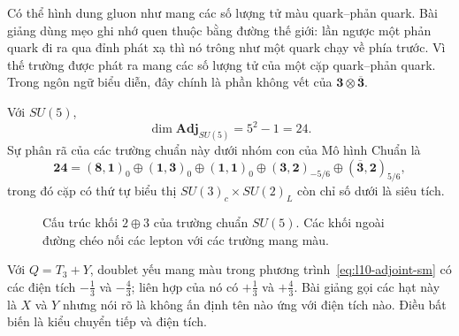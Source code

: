 Có thể hình dung gluon như mang các số lượng tử màu quark--phản quark. Bài giảng dùng mẹo ghi nhớ quen thuộc bằng đường thế giới: lần ngược một phản quark đi ra qua đỉnh phát xạ thì nó trông như một quark chạy về phía trước. Vì thế trường được phát ra mang các số lượng tử của một cặp quark--phản quark. Trong ngôn ngữ biểu diễn, đây chính là phần không vết của \(\mathbf3\otimes\overline{\mathbf3}\).

Với \(SU(5)\),
\begin{equation}
\dim\mathbf{Adj}_{SU(5)}=5^2-1=24.
\end{equation}
Sự phân rã của các trường chuẩn này dưới nhóm con của Mô hình Chuẩn là
\begin{equation}
\mathbf{24}
=
(\mathbf8,\mathbf1)_0
\oplus(\mathbf1,\mathbf3)_0
\oplus(\mathbf1,\mathbf1)_0
\oplus(\mathbf3,\mathbf2)_{-5/6}
\oplus(\overline{\mathbf3},\mathbf2)_{5/6},
\label{eq:l10-adjoint-sm}
\end{equation}
trong đó cặp có thứ tự biểu thị \(SU(3)_c\times SU(2)_L\) còn chỉ số dưới là siêu tích.


\begin{figure}[htbp]
\centering
{}
\caption{Cấu trúc khối \(2\oplus3\) của trường chuẩn \(SU(5)\). Các khối ngoài đường chéo nối các lepton với các trường mang màu.}
\label{fig:l10-gauge-blocks}
\end{figure}

Với \(Q=T_3+Y\), doublet yếu mang màu trong phương trình~\eqref{eq:l10-adjoint-sm} có các điện tích \(-\tfrac13\) và \(-\tfrac43\); liên hợp của nó có \(+\tfrac13\) và \(+\tfrac43\). Bài giảng gọi các hạt này là \(X\) và \(Y\) nhưng nói rõ là không ấn định tên nào ứng với điện tích nào. Điều bất biến là kiểu chuyển tiếp và điện tích.

